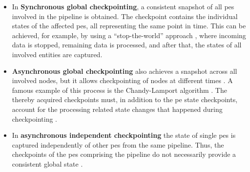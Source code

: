 \begin{itemize}
    \item In \textbf{Synchronous global checkpointing}, a consistent snapshot of all \gls{pe}s involved in the pipeline is obtained. The checkpoint contains the individual states of the affected \gls{pe}s, all representing the same point in time. This can be achieved, for example, by using a “stop-the-world” approach \cite{Murray.2013, Gibson.2014}, where incoming data is stopped, remaining data is processed, and after that, the states of all involved entities are captured.
    \item \textbf{Asynchronous global checkpointing} also achieves a snapshot across all involved nodes, but it allows checkpointing of nodes at different times \cite{Gibson.2014}. A famous example of this process is the Chandy-Lamport algorithm \cite{Chandy.1985}. The thereby acquired checkpoints must, in addition to the \gls{pe} state checkpoints, account for the processing related state changes that happened during checkpointing \cite{Chandy.1985}.
    \item In \textbf{asynchronous independent checkpointing} the state of single \gls{pe}s is captured independently of other \gls{pe}s from the same pipeline. Thus, the checkpoints of the \gls{pe}s comprising the pipeline do not necessarily provide a consistent global state \cite{Gibson.2014}.
\end{itemize}


